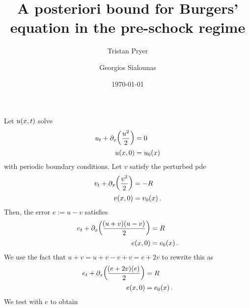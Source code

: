 \documentclass[final]{amsart}
\author{
  Tristan Pryer
}
\author{
  Georgios Sialounas
}
\title{A posteriori bound for Burgers' equation in the pre-schock regime}
\date{\today}
\numberwithin{equation}{section}
\begin{document}
\maketitle


Let $u\!\left({x,t}\right)$ solve 
\begin{equation}
\begin{aligned}
u_t+\partial_x\!\left({\frac{u^2}{2}}\right)&=0\\
u\!\left({x,0}\right)&=u_0\!\left({x}\right)
\end{aligned}
\end{equation}
with periodic boundary conditions.  Let $v$ satisfy the perturbed pde
\begin{equation}
\begin{aligned}
v_t+\partial_x\!\left({\frac{v^2}{2}}\right)&=-R\\
v\!\left({x,0}\right)&=v_0\!\left({x}\right).
\end{aligned}
\end{equation}
Then, the error $e:=u-v$ satisfies
\begin{equation}
\begin{aligned}
e_t+\partial_x\!\left({\frac{\!\left({u+v}\right)\!\left({u-v}\right)}{2}}\right)&=R\\
e\!\left({x,0}\right)&=e_0\!\left({x}\right).
\end{aligned}
\end{equation}
We use the fact that $u+v = u+v-v+v = e+2v$ to rewrite this as
\begin{equation}
\begin{aligned}
e_t+\partial_x\!\left({\frac{\!\left({e+2v}\right)\!\left({e}\right)}{2}}\right)&=R\\
e\!\left({x,0}\right)&=e_0\!\left({x}\right).
\end{aligned}
\end{equation}
We test with $e$ to obtain
\end{document}
